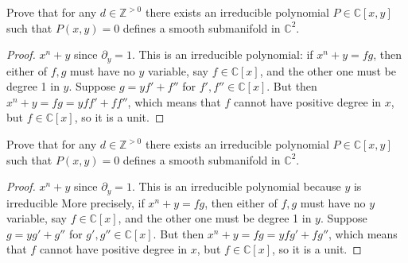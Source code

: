\begin{exercise}
\label{exercise-smooth-irreducible-plane}
Prove that for any $d \in  \mathbb{Z}^{>0}$
there exists an irreducible polynomial
$P \in \mathbb{C}[x,y]$ such that
$P(x,y)=0$ defines a smooth submanifold
in $\mathbb{C}^2$.
\end{exercise}

\begin{proof}
$x^n+y$ since $\partial_y =1$.
This is an irreducible polynomial:
if $x^n+y = fg$, then either of $f,g$
must have no $y$ variable, say $f \in
\mathbb{C}[x]$,
and the other one must be degree 1 in $y$.
Suppose $g = y f' + f''$ for $f',f'' \in
\mathbb{C}[x]$. But then
$x^n+y = fg = yff' + f f''$,
which means that $f$ cannot have positive
degree in $x$, but $f \in \mathbb{C}[x]$,
so it is a unit.
\end{proof}

\begin{exercise}
\label{exercise-smooth-irreducible-plane}
Prove that for any $d \in  \mathbb{Z}^{>0}$
there exists an irreducible polynomial
$P \in \mathbb{C}[x,y]$ such that
$P(x,y)=0$ defines a smooth submanifold
in $\mathbb{C}^2$.
\end{exercise}

\begin{proof}
$x^n+y$ since $\partial_y =1$.
This is an irreducible polynomial
because $y$ is irreducible
More precisely,
if $x^n+y = fg$, then either of $f,g$
must have no $y$ variable, say $f \in
\mathbb{C}[x]$,
and the other one must be degree 1 in $y$.
Suppose $g = y g' + g''$ for $g',g'' \in
\mathbb{C}[x]$. But then
$x^n+y = fg = yfg' + f g''$,
which means that $f$ cannot have positive
degree in $x$, but $f \in \mathbb{C}[x]$,
so it is a unit.
\end{proof}



